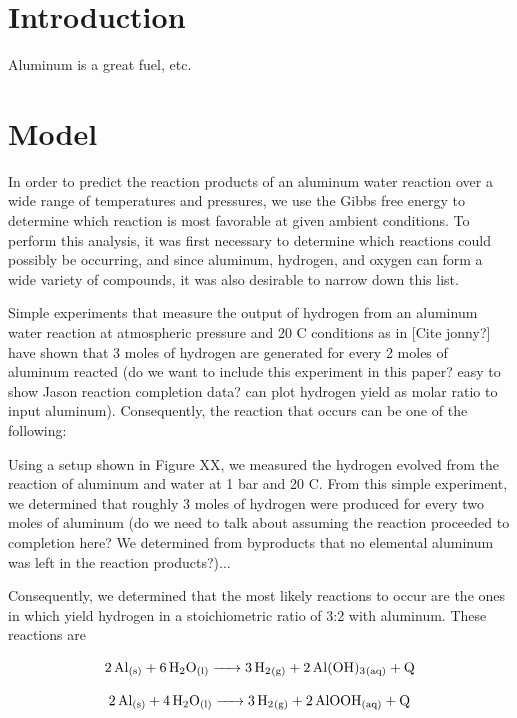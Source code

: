 \documentclass[preprint,12pt,3p]{elsarticle}
\begin{document}
\section{Introduction}
\label{introduction}

Aluminum is a great fuel, etc.

\section{Model}
\label{model}

In order to predict the reaction products of an aluminum water reaction over a
wide range of temperatures and pressures, we use the Gibbs free energy to
determine which reaction is most favorable at given ambient conditions. To
perform this analysis, it was first necessary to determine which reactions could
possibly be occurring, and since aluminum, hydrogen, and oxygen can form a wide
variety of compounds, it was also desirable to narrow down this list.

Simple experiments that measure the output of hydrogen from an aluminum water
reaction at atmospheric pressure and 20 \textdegree C conditions as in [Cite
jonny?] have shown that 3 moles of hydrogen are generated for every 2 moles of
aluminum reacted (do we want to include this experiment in this paper? easy to
show Jason reaction completion data? can plot hydrogen yield as molar ratio to
input aluminum). Consequently, the reaction that occurs can be one of the
following:

Using a setup shown in Figure XX, we measured the hydrogen evolved from the
reaction of aluminum and water at 1 bar and 20 \textdegree C. From this simple
experiment, we determined that roughly 3 moles of hydrogen were produced for
every two moles of aluminum (do we need to talk about assuming the reaction
proceeded to completion here? We determined from byproducts that no elemental
aluminum was left in the reaction products?)...

Consequently, we determined that the most likely reactions to occur are the
ones in which yield hydrogen in a stoichiometric ratio of 3:2 with aluminum.
These reactions are

\begin{equation}
  \ce{2Al_{(s)} + 6H2O_{(l)} -> 3H2_{(g)} + 2Al(OH)3_{(aq)} + Q}
  \label{eq:hydroxide}
\end{equation}

\begin{equation}
  \ce{2Al_{(s)} + 4H2O_{(l)} -> 3H2_{(g)} + 2AlOOH_{(aq)} + Q}
  \label{eq:oxyhydroxide}
\end{equation}
\end{document}
